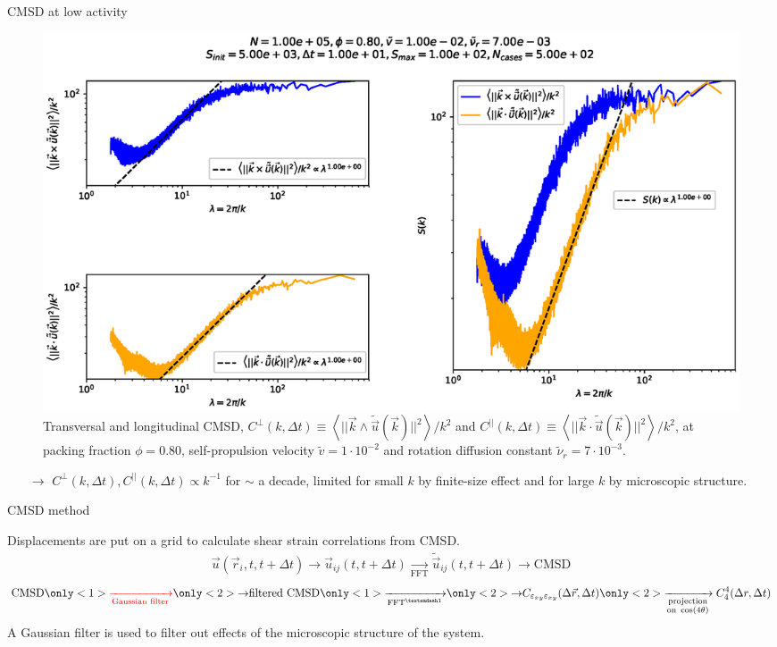 \documentclass{beamer}
\begin{document}
\begin{frame}{CMSD at low activity}

\vspace{-0.2cm}
\begin{figure}[h!]
  \centering
  \includegraphics[width=0.85\linewidth]{Cttb_Dk8000_Vj1000_Ri7000_Nq1000_Io5000_Tl1000_Mn1000_Cn5000.eps}
  \vspace{-0.8cm}
  \caption{Transversal and longitudinal CMSD, $C^{\perp}(k, \Delta t) \equiv \left<||\vec{k}\wedge\tilde{\vec{u}}(\vec{k})||^2\right>/k^2$ and $C^{||}(k, \Delta t) \equiv \left<||\vec{k}\cdot\tilde{\vec{u}}(\vec{k})||^2\right>/k^2$, at packing fraction $\phi=0.80$, self-propulsion velocity $\tilde{v}=1\cdot10^{-2}$ and rotation diffusion constant $\tilde{\nu}_r=7\cdot10^{-3}$.}
\end{figure}

\vspace{-0.5cm}
\begin{itemize}
  \item[$\rightarrow$] $C^{\perp}(k, \Delta t), C^{||}(k, \Delta t) \propto k^{-1}$ for $\sim$ a decade, limited for small $k$ by finite-size effect and for large $k$ by microscopic structure.
\end{itemize}

\end{frame}

\begin{frame}{CMSD method}

Displacements are put on a grid to calculate shear strain correlations from CMSD.
\begin{align*}
\vec{u}(\vec{r}_i, t, t + \Delta t)\rightarrow \vec{u}_{ij}(t, t + \Delta t)\xrightarrow[\text{FFT}]{} \tilde{\vec{u}}_{ij}(t, t + \Delta t)\rightarrow \text{CMSD}
\end{align*}
\begin{align*}
\text{CMSD} {\only<1>{\color{red}\xrightarrow[\text{Gaussian filter}]{}}\only<2>{\rightarrow}\text{filtered CMSD}} \only<1>{\xrightarrow[\text{FFT}^{—1}]{}}\only<2>{\rightarrow} C_{\varepsilon_{xy}\varepsilon_{xy}}(\Delta\vec{r}, \Delta t)\only<2>{\xrightarrow[\substack{\text{projection}\\\text{on }\cos(4\theta)}]{} C_4^4(\Delta r, \Delta t)}
\end{align*}
A Gaussian filter is used to filter out effects of the microscopic structure of the system.

\end{frame}
\end{document}
